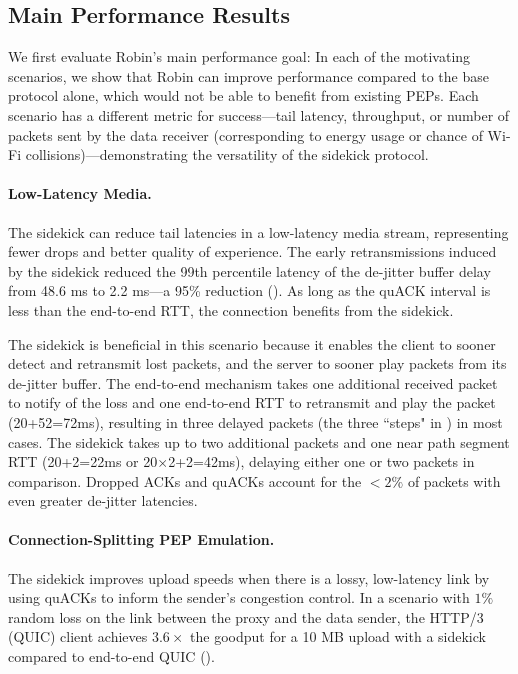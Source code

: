 \subsection{Main Performance Results}


We first evaluate Robin's main performance goal: In each of the motivating
scenarios, we show that Robin can improve performance compared to the base
protocol alone, which would not be able to benefit from existing PEPs.
Each scenario has a different metric for success---tail latency, throughput,
or number of packets sent by the data receiver (corresponding to energy usage
or chance of Wi-Fi collisions)---demonstrating the versatility of the sidekick
protocol.

\paragraph{Low-Latency Media.}
The sidekick can reduce tail latencies in a low-latency media stream, representing
fewer drops and better quality of experience.
The early retransmissions induced by the sidekick reduced the 99th percentile
latency of the de-jitter buffer delay from 48.6 ms to 2.2 ms---a 95\%
reduction ().
As long as the quACK interval is less than the end-to-end RTT, the connection
benefits from the sidekick.

The sidekick is beneficial in this scenario because it enables the client to sooner
detect and retransmit lost packets, and the server to sooner play packets from
its de-jitter buffer.
The end-to-end mechanism takes one additional received packet to notify of the
loss and
one end-to-end RTT to retransmit and play the packet (20+52=72ms), resulting in
three delayed packets (the three ``steps" in ) in most cases.
The sidekick takes up to two additional packets and one near path segment RTT
(20+2=22ms or 20$\times$2+2=42ms), delaying either one or two packets in comparison.
Dropped ACKs and quACKs account for the $<2\%$ of packets with even greater
de-jitter latencies.

\paragraph{Connection-Splitting PEP Emulation.}
The sidekick improves upload speeds when there is a lossy, low-latency link
by using quACKs to inform the sender's congestion control.
In a scenario with $1\%$ random loss on the link between the proxy and the
data sender, the HTTP/3 (QUIC) client achieves $3.6\times$ the goodput for a 10 MB
upload with a sidekick compared to end-to-end QUIC ().

